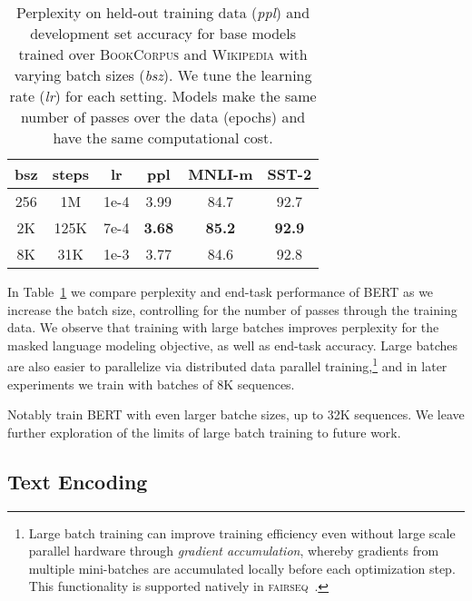 \documentclass[11pt]{article}
\newcommand{\bertbase}{BERT}
\begin{document}
\begin{table}[t]

\begin{center}
\begin{tabular}{cccccc}
\toprule


\bf bsz & \bf steps & \bf lr & \bf ppl & \bf MNLI-m & \bf SST-2 \\
\midrule
256 & 1M & 1e-4 & 3.99 & 84.7 & 92.7 \\
2K & 125K & 7e-4 & \textbf{3.68} & \textbf{85.2} & \textbf{92.9} \\
8K & 31K & 1e-3 & 3.77 & 84.6 & 92.8 \\
\bottomrule
\end{tabular}
\end{center}
\caption{
Perplexity on held-out training data (\emph{ppl}) and development set accuracy for base models trained over \textsc{BookCorpus} and \textsc{Wikipedia} with varying batch sizes (\emph{bsz}).
We tune the learning rate (\emph{lr}) for each setting.
Models make the same number of passes over the data (epochs) and have the same computational cost.
}

\label{tab:large_batches}

\end{table} 
In Table~\ref{tab:large_batches} we compare perplexity and end-task performance of \bertbase{} as we increase the batch size, controlling for the number of passes through the training data.
We observe that training with large batches improves perplexity for the masked language modeling objective, as well as end-task accuracy.
Large batches are also easier to parallelize via distributed data parallel training,\footnote{Large batch training can improve training efficiency even without large scale parallel hardware through \emph{gradient accumulation}, whereby gradients from multiple mini-batches are accumulated locally before each optimization step. This functionality is supported natively in \textsc{fairseq}~\cite{ott2019fairseq}.} and in later experiments we train with batches of 8K sequences.

Notably  train BERT with even larger batche sizes, up to 32K sequences.
We leave further exploration of the limits of large batch training to future work.




\subsection{Text Encoding}
\label{sec:bpe}
\end{document}
